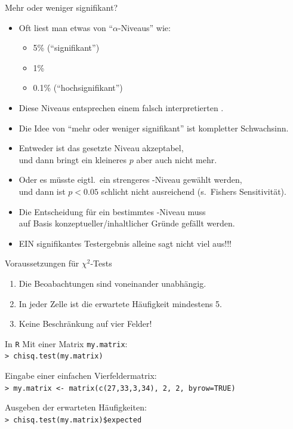 \begin{frame}
  {Mehr oder weniger signifikant?}
  \begin{itemize}[<+->]
    \item Oft liest man etwas von "`$\alpha$-Niveaus"' wie:
      \begin{itemize}[<+->]
	\item 5\% ("`signifikant"')
	\item 1\%
	\item 0.1\% ("`hochsignifikant"')
      \end{itemize}
    \item Diese Niveaus entsprechen einem falsch interpretierten \Sig.
    \item Die Idee von "`mehr oder weniger signifikant"' ist \alert{kompletter Schwachsinn}.
    \item Entweder ist das gesetzte Niveau akzeptabel,\\
      und dann bringt ein kleineres $p$ aber auch nicht mehr.
    \item Oder es müsste eigtl.\ ein strengeres \Sig-Niveau gewählt werden,\\
      und dann ist $p<0.05$ schlicht nicht ausreichend (s.\ Fishers \alert{Sensitivität}).
    \item Die Entscheidung für ein bestimmtes \Sig-Niveau muss\\
      auf Basis konzeptueller\slash inhaltlicher Gründe gefällt werden.
    \item \alert{EIN signifikantes Testergebnis alleine sagt nicht viel aus!!!}
  \end{itemize}
\end{frame}




\begin{frame}{Voraussetzungen für $\chi^2$-Tests}
  \begin{enumerate}[<+->]
    \item Die Beoabachtungen sind voneinander unabhängig.
    \item In jeder Zelle ist die erwartete Häufigkeit mindestens 5.
    \item Keine Beschränkung auf vier Felder!
  \end{enumerate}
\end{frame}

\begin{frame}
  {In \texttt{R}}
  Mit einer Matrix \texttt{my.matrix}:\\
  \texttt{> chisq.test(my.matrix)}\\
  \vspace{0.5cm}
  
  Eingabe einer einfachen Vierfeldermatrix:\\
  \texttt{> my.matrix <- matrix(c(27,33,3,34), 2, 2, byrow=TRUE)}\\
  \vspace{0.5cm}
  
  Ausgeben der erwarteten Häufigkeiten:\\
  \texttt{> chisq.test(my.matrix)\$expected}\\

  \end{frame}

